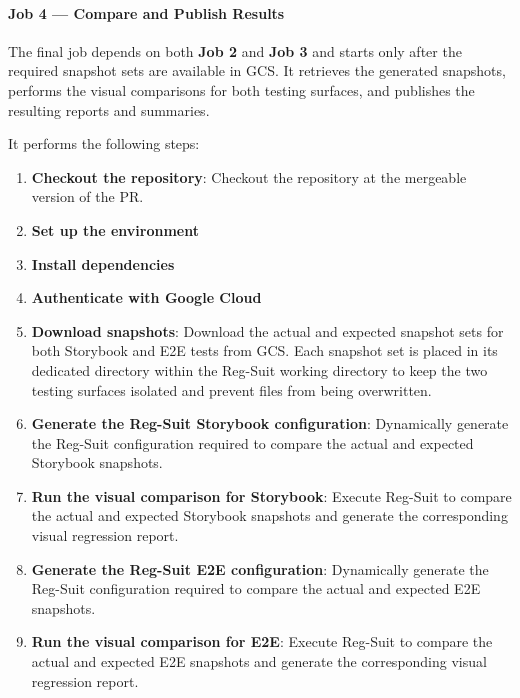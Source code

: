 \paragraph{Job 4 --- Compare and Publish Results}

The final job depends on both \textbf{Job 2} and \textbf{Job 3} and starts only after the required snapshot sets are available in \ac{GCS}. It retrieves the generated snapshots, performs the visual comparisons for both testing surfaces, and publishes the resulting reports and summaries.

It performs the following steps:

\begin{enumerate}
    \item \textbf{Checkout the repository}: Checkout the repository at the mergeable version of the \ac{PR}.

    \item \textbf{Set up the environment}

    \item \textbf{Install dependencies}

    \item \textbf{Authenticate with Google Cloud}

    \item \textbf{Download snapshots}: Download the actual and expected snapshot sets for both Storybook and E2E tests from \ac{GCS}. Each snapshot set is placed in its dedicated directory within the Reg-Suit working directory to keep the two testing surfaces isolated and prevent files from being overwritten.

    \item \textbf{Generate the Reg-Suit Storybook configuration}: Dynamically generate the Reg-Suit configuration required to compare the actual and expected Storybook snapshots.

    \item \textbf{Run the visual comparison for Storybook}: Execute Reg-Suit to compare the actual and expected Storybook snapshots and generate the corresponding visual regression report.

    \item \textbf{Generate the Reg-Suit E2E configuration}: Dynamically generate the Reg-Suit configuration required to compare the actual and expected E2E snapshots.

    \item \textbf{Run the visual comparison for E2E}: Execute Reg-Suit to compare the actual and expected E2E snapshots and generate the corresponding visual regression report.


\end{enumerate}
